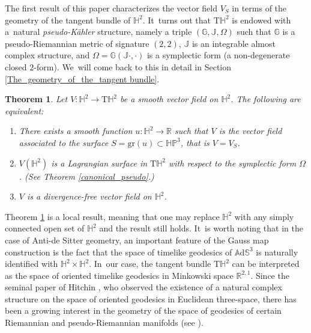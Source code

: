 \documentclass[JEP,XML,SOM,Unicode,NoEqCountersInSection, NoFloatCountersInSection,published]{cedram}
\theoremstyle{plain}
\newtheorem{theorem}[cor]{Theorem}
\theoremstyle{definition}
\newcommand{\ads}{\mathbb{A}\mathrm{d}\mathbb{S}^3}
\newcommand{\HP}{\mathbb{HP}^3}
\begin{document}
The first result of this paper characterizes the vector field \(V_S\) in terms of the geometry of the tangent bundle of \(\mathbb{H}^2\). It~turns out that \(\mathrm{T}\mathbb{H}^2\) is endowed with a~natural \emph{pseudo-Kähler} structure, namely a triple \((\mathbb{G}, \mathbb{J}, \Omega)\) such that \(\mathbb{G}\) is a pseudo-Riemannian metric of signature \((2,2)\), \(\mathbb{J}\) is an integrable almost complex structure, and \(\Omega = \mathbb{G}(\mathbb{J} \cdot, \cdot)\) is a symplectic form (a non-degenerate closed $2$-form). We~will come back to this in detail in Section \ref{The_geometry_of_the_tangent bundle}.
\begin{theorem}\label{intro_divergence}
Let \(V: \mathbb{H}^2 \to \mathrm{T}\mathbb{H}^2\) be a smooth vector field on \(\mathbb{H}^2\). The following are equivalent:
\begin{enumerate}
\item There exists a smooth function \(u: \mathbb{H}^2 \to \mathbb{R}\) such that \(V\) is the vector field associated to the surface \(S = \mathrm{gr}(u) \subset \HP\), that is \(V = V_S\).
\item \(V(\mathbb{H}^2)\) is a \emph{Lagrangian} surface in \(\mathrm{T}\mathbb{H}^2\) with respect to the symplectic form \(\Omega\). (See Theorem \ref{canonical_pseudo}.)
\item \(V\) is a divergence-free vector field on \(\mathbb{H}^2\).
\end{enumerate}
\end{theorem}

Theorem \ref{intro_divergence} is a local result, meaning that one may replace $\mathbb{H}^2$ with any simply connected open set of $\mathbb{H}^2$ and the result still holds. It~is worth noting that in the case of Anti-de Sitter geometry, an important feature of the Gauss map construction is the fact that the space of timelike geodesics of \(\ads\) is naturally identified with \(\mathbb{H}^2 \times \mathbb{H}^2\). In~our case, the tangent bundle \(\mathrm{T}\mathbb{H}^2\) can be interpreted as the space of oriented timelike geodesics in Minkowski space \(\mathbb{R}^{2,1}\). Since the seminal paper of Hitchin \cite{Monopole_Hitchin}, who observed the existence of a natural complex structure on the space of oriented geodesics in Euclidean three-space, there has been a growing interest in the geometry of the space of geodesics of certain Riemannian and pseudo-Riemannian manifolds (see \cite{An_indi_Kaehler,Anciaux_space_of_geodesic,Salvai_Godoy_smooth_foliation,ML_in_tangent_bundle,Bon_Emam,Emam_Seppi1}).
\end{document}
